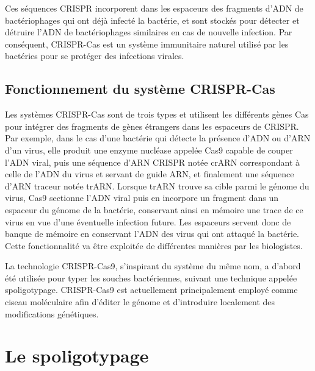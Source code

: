 \documentclass[twoside,a4paper,11pt,frenchb,openany]{report}
\begin{document}
Ces séquences CRISPR incorporent dans les espaceurs des fragments d'ADN de bactériophages qui ont déjà infecté la bactérie, et sont stockés pour détecter et détruire l'ADN de bactériophages similaires en cas de nouvelle infection. Par conséquent, CRISPR-Cas est un système immunitaire naturel utilisé par les bactéries pour se protéger des infections virales. 


\subsection{Fonctionnement du système CRISPR-Cas}

Les systèmes CRISPR-Cas sont de trois types et utilisent les différents gènes Cas pour intégrer des fragments de gènes étrangers dans les espaceurs de CRISPR. Par exemple, dans le cas d'une bactérie qui détecte la présence d'ADN ou d'ARN d'un virus, elle produit une enzyme nucléase appelée Cas9 capable de couper l'ADN viral, puis une séquence d'ARN CRISPR notée crARN correspondant à celle de l'ADN du virus et servant de guide ARN, et finalement une séquence d'ARN traceur notée trARN. Lorsque trARN trouve sa cible parmi le génome du virus, Cas9 sectionne l'ADN viral puis en incorpore un fragment dans un espaceur du génome de la bactérie, conservant ainsi en mémoire une trace de ce virus en vue d'une éventuelle infection future. Les espaceurs servent donc de banque de mémoire en conservant l'ADN des virus qui ont attaqué la bactérie. Cette fonctionnalité va être exploitée de différentes manières par les biologistes.

La technologie CRISPR-Cas9, s'inspirant du système du même nom, a d'abord été utilisée pour typer les souches bactériennes, suivant une technique appelée spoligotypage. CRISPR-Cas9 est actuellement principalement employé comme ciseau moléculaire afin d'éditer le génome et d'introduire localement des modifications génétiques.


\section{Le spoligotypage}
\end{document}
